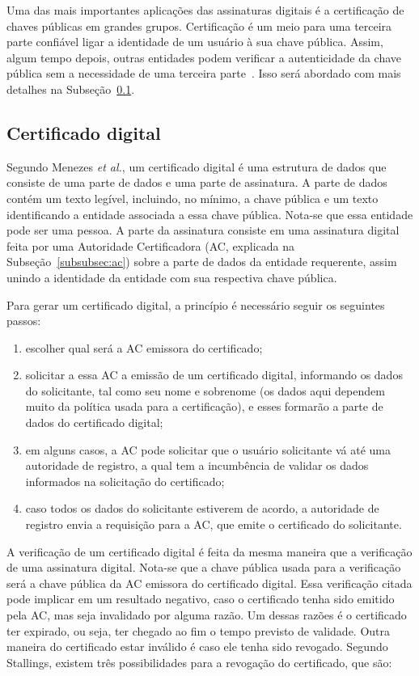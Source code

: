 \documentclass{article}
\begin{document}
Uma das mais importantes aplicações das assinaturas digitais é a certificação
de chaves públicas em grandes grupos. Certificação é um meio para uma terceira
parte confiável ligar a identidade de um usuário à sua chave pública. Assim,
algum tempo depois, outras entidades podem verificar a autenticidade da chave
pública sem a necessidade de uma terceira parte~\cite{Menezes:book:1996}. Isso
será abordado com mais detalhes na Subseção~\ref{subsec:digitalcert}.

\subsection{Certificado digital}\label{subsec:digitalcert}

Segundo Menezes \textit{et al.}, um certificado digital é uma estrutura de
dados que consiste de uma parte de dados e uma parte de assinatura. A parte de
dados contém um texto legível, incluindo, no mínimo, a chave pública e um texto
identificando a entidade associada a essa chave pública. Nota-se que essa
entidade pode ser uma pessoa. A parte da assinatura consiste em uma assinatura
digital feita por uma Autoridade Certificadora (AC, explicada na
Subseção~\ref{subsubsec:ac}) sobre a parte de dados da entidade requerente,
assim unindo a identidade da entidade com sua respectiva chave pública.

Para gerar um certificado digital, a princípio é necessário seguir os seguintes
passos:

\begin{enumerate}
  \item escolher qual será a AC emissora do certificado;
  \item solicitar a essa AC a emissão de um certificado digital, informando os
      dados do solicitante, tal como seu nome e sobrenome (os dados aqui
        dependem muito da política usada para a certificação), e esses formarão
        a parte de dados do certificado digital;
  \item em alguns casos, a AC pode solicitar que o usuário solicitante vá até
      uma autoridade de registro, a qual tem a incumbência de validar os dados
        informados na solicitação do certificado;
  \item caso todos os dados do solicitante estiverem de acordo, a autoridade de
      registro envia a requisição para a AC, que emite o certificado do
        solicitante.
\end{enumerate}

A verificação de um certificado digital é feita da mesma maneira que a
verificação de uma assinatura digital. Nota-se que a chave pública usada para a
verificação será a chave pública da AC emissora do certificado digital. Essa
verificação citada pode implicar em um resultado negativo, caso o certificado
tenha sido emitido pela AC, mas seja invalidado por alguma razão. Um dessas
razões é o certificado ter expirado, ou seja, ter chegado ao fim o tempo
previsto de validade. Outra maneira do certificado estar inválido é caso ele
tenha sido revogado. Segundo Stallings, existem três possibilidades para a
revogação do certificado, que são:
\end{document}
